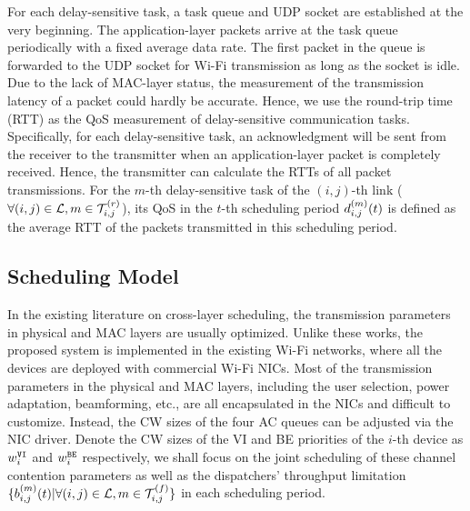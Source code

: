For each delay-sensitive task, a task queue and UDP socket are established at the very beginning. The application-layer packets arrive at the task queue periodically with a fixed average data rate. The first packet in the queue is forwarded to the UDP socket for Wi-Fi transmission as long as the socket is idle. Due to the lack of MAC-layer status, the measurement of the transmission latency of a packet could hardly be accurate. Hence, we use the round-trip time (RTT) as the QoS measurement of delay-sensitive communication tasks. Specifically, for each delay-sensitive task, an acknowledgment will be sent from the receiver to the transmitter when an application-layer packet is completely received. Hence, the transmitter can calculate the RTTs of all packet transmissions. For the {$m$}-th delay-sensitive task of the {$(i,j)$}-th link ($\forall (i,j) \in{\mathcal{L}}, {m} \in{\mathcal{T}_{i,j}^{(r)}}$), its QoS in the $t$-th scheduling period {$d_{i,j}^{(m)}(t)$} is defined as the average RTT of the packets transmitted in this scheduling period.


\subsection{Scheduling Model}

In the existing literature on cross-layer scheduling, the transmission parameters in physical and MAC layers are usually optimized. Unlike these works, the proposed {\algName} system is {implemented} in the existing Wi-Fi networks, where all the devices are deployed with commercial Wi-Fi NICs. Most of the transmission parameters in the physical and MAC layers, including the user selection, power adaptation, beamforming, etc., are all encapsulated in the NICs and difficult to customize. Instead, the CW sizes of the four AC queues can be adjusted via the NIC driver. Denote the CW sizes of the VI and BE priorities of the ${i}$-th device as  $w_{i}^{\mathtt{VI}}$ and $w_{i}^{\mathtt{BE}}$ respectively, we shall focus on the joint scheduling of these channel contention parameters as well as the dispatchers' throughput limitation $\{{b}_{i,j}^{(m)}(t)|\forall (i,j) \in{\mathcal{L}},{m} \in{\mathcal{T}_{i,j}^{(f)}}\}$ in each scheduling period.

